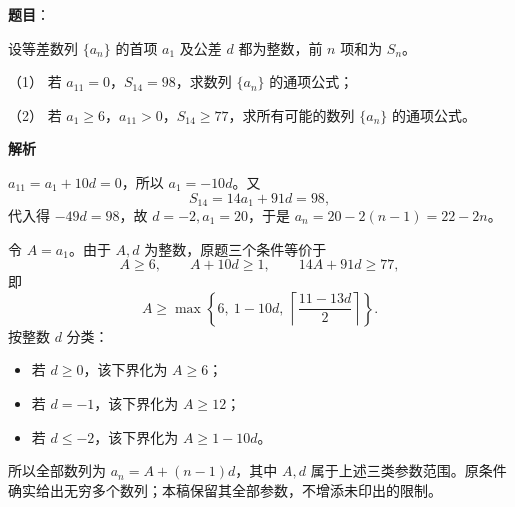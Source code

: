 \begin{answer}

\textbf{题目}：

设等差数列 $\{a_n\}$ 的首项 $a_1$ 及公差 $d$ 都为整数，前 $n$ 项和为 $S_n$。

（1） 若 $a_{11}=0$，$S_{14}=98$，求数列 $\{a_n\}$ 的通项公式；

（2） 若 $a_1\ge 6$，$a_{11}>0$，$S_{14}\ge 77$，求所有可能的数列 $\{a_n\}$ 的通项公式。

\textbf{解析}


$a_{11}=a_1+10d=0$，所以 $a_1=-10d$。又
\nopagebreak[4]
\[
S_{14}=14a_1+91d=98,
\]
代入得 $-49d=98$，故 $d=-2,a_1=20$，于是 $a_n=20-2(n-1)=22-2n$。


令 $A=a_1$。由于 $A,d$ 为整数，原题三个条件等价于
\nopagebreak[4]
\[
A\ge6,\qquad A+10d\ge1,\qquad 14A+91d\ge77,
\]
即
\nopagebreak[4]
\[
A\ge\max\left\{6,\ 1-10d,\ \left\lceil\frac{11-13d}{2}\right\rceil\right\}.
\]
按整数 $d$ 分类：

\begin{itemize}
\item 若 $d\ge0$，该下界化为 $A\ge6$；
\item 若 $d=-1$，该下界化为 $A\ge12$；
\item 若 $d\le-2$，该下界化为 $A\ge1-10d$。
\end{itemize}

所以全部数列为 $a_n=A+(n-1)d$，其中 $A,d$ 属于上述三类参数范围。原条件确实给出无穷多个数列；本稿保留其全部参数，不增添未印出的限制。



\par\medskip

\end{answer}